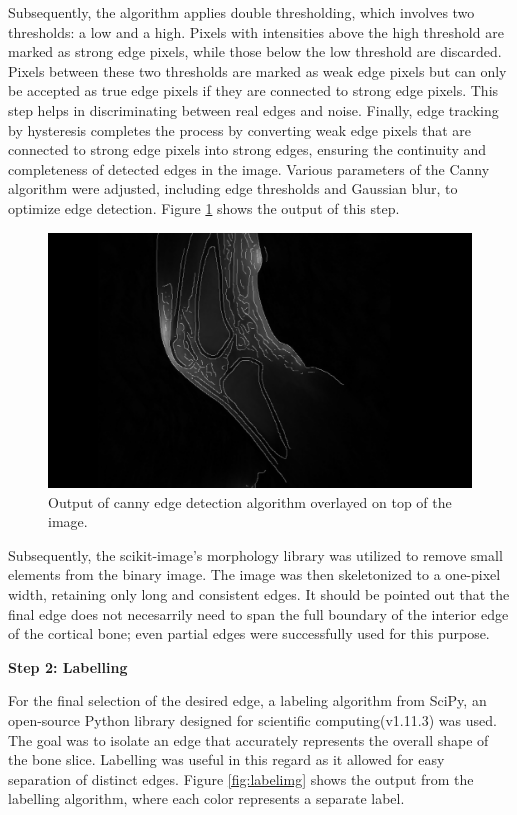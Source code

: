 \documentclass{micro-econ-thesis}
\begin{document}
Subsequently, the algorithm applies double thresholding, which involves two thresholds: a low and a high. Pixels with intensities above the high threshold are marked as strong edge pixels, while those below the low threshold are discarded. Pixels between these two thresholds are marked as weak edge pixels but can only be accepted as true edge pixels if they are connected to strong edge pixels. This step helps in discriminating between real edges and noise. Finally, edge tracking by hysteresis completes the process by converting weak edge pixels that are connected to strong edge pixels into strong edges, ensuring the continuity and completeness of detected edges in the image. Various parameters of the Canny algorithm were adjusted, including edge thresholds and Gaussian blur, to optimize edge detection. Figure \ref{fig:edgemitimg} shows the output of this step.  
\begin{figure}[H]
	\centering
	\includegraphics[width=0.7\linewidth]{edge_new}
	\caption{Output of canny edge detection algorithm overlayed on top of the image.}
	\label{fig:edgemitimg}
\end{figure}


Subsequently, the scikit-image's morphology library was utilized to remove small elements from the binary image. The image was then skeletonized to a one-pixel width, retaining only long and consistent edges. It should be pointed out that the final edge does not necesarrily need to span the full boundary of the interior edge of the cortical bone; even partial edges were successfully used for this purpose.  

\textbf{Step 2: Labelling}

For the final selection of the desired edge, a labeling algorithm from SciPy, an open-source Python library designed for scientific computing(v1.11.3) was used. The goal was to isolate an edge that accurately represents the overall shape of the bone slice. Labelling was useful in this regard as it allowed for easy separation of distinct edges. Figure \ref{fig:labelimg} shows the output from the labelling algorithm, where each color represents a separate label. 
\end{document}
